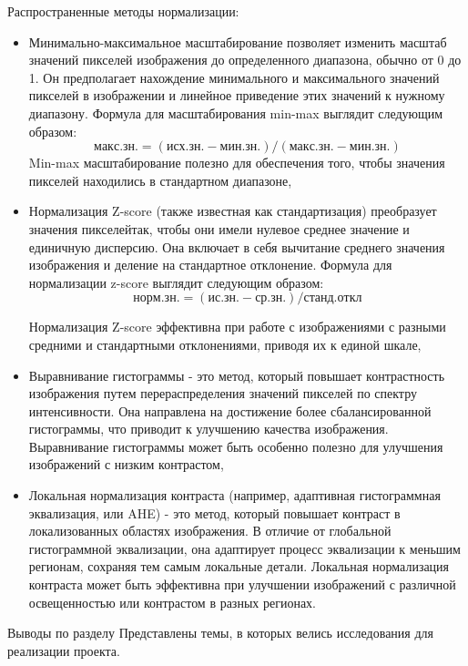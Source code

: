 Распространенные методы нормализации:
\begin{itemize}
    \item Минимально-максимальное масштабирование позволяет изменить масштаб значений пикселей изображения до определенного диапазона, обычно от 0 до 1. Он предполагает нахождение минимального и максимального значений пикселей в изображении и линейное приведение этих значений к нужному диапазону. Формула для масштабирования min-max выглядит следующим образом:
\begin{equation}
    \label{f1}
    \mathrm{макс.зн.} = (\mathrm{исх.зн.} - \mathrm{мин.зн.}) / (\mathrm{макс.зн.} - \mathrm{мин.зн.})
\end{equation}
Min-max масштабирование полезно для обеспечения того, чтобы значения пикселей находились в стандартном диапазоне,
    \item Нормализация Z-score (также известная как стандартизация) преобразует значения пикселейтак, чтобы они имели нулевое среднее значение и единичную дисперсию. Она включает в себя вычитание среднего значения изображения и деление на стандартное отклонение. Формула для нормализации z-score выглядит следующим образом:
\begin{equation}
    \label{f2}
    \mathrm{норм.зн.} = (\mathrm{ис.зн.} - \mathrm{ср.зн.}) / \mathrm{станд.откл}
\end{equation}


Нормализация Z-score эффективна при работе с изображениями с разными средними и стандартными отклонениями, приводя их к единой шкале,
    \item Выравнивание гистограммы - это метод, который повышает контрастность изображения путем перераспределения значений пикселей по спектру интенсивности. Она направлена на достижение более сбалансированной гистограммы, что приводит к улучшению качества изображения. Выравнивание гистограммы может быть особенно полезно для улучшения изображений с низким контрастом,
    \item Локальная нормализация контраста (например, адаптивная гистограммная эквализация, или AHE) - это метод, который повышает контраст в локализованных областях изображения. В отличие от глобальной гистограммной эквализации, она адаптирует процесс эквализации к меньшим регионам, сохраняя тем самым локальные детали. Локальная нормализация контраста может быть эффективна при улучшении изображений с различной освещенностью или контрастом в разных регионах.
\end{itemize}


Выводы по разделу
Представлены темы, в которых велись исследования  для реализации проекта.

